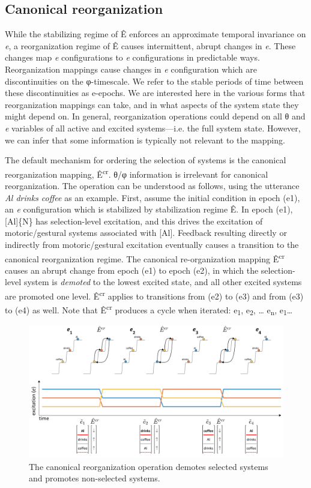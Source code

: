 \subsection{Canonical reorganization}

While the stabilizing regime of Ê enforces an approximate temporal invariance on \textit{e}, a reorganization regime of Ê causes intermittent, abrupt changes in \textit{e}. These changes map \textit{e} configurations to \textit{e} configurations in predictable ways. Reorganization mappings cause changes in \textit{e} configuration which are discontinuities on the φ-timescale. We refer to the stable periods of time between these discontinuities as e-epochs. We are interested here in the various forms that reorganization mappings can take, and in what aspects of the system state they might depend on. In general, reorganization operations could depend on all θ and \textit{e} variables of all active and excited systems—i.e. the full system state. However, we can infer that some information is typically not relevant to the mapping. 

  The default mechanism for ordering the selection of systems is the canonical reorganization mapping, Ê\textsuperscript{cr}. θ/φ information is irrelevant for canonical reorganization. The operation  can be understood as follows, using the utterance \textit{Al drinks coffee} as an example. First, assume the initial condition in epoch (e1), an \textit{e} configuration which is stabilized by stabilization regime Ê. In epoch (e1), [Al]\{N\} has selection-level excitation, and this drives the excitation of motoric/gestural systems associated with [Al]. Feedback resulting directly or indirectly from motoric/gestural excitation eventually causes a transition to the canonical reorganization regime. The canonical re-organization mapping Ê\textsuperscript{cr} causes an abrupt change from epoch (e1) to epoch (e2), in which the selection-level system is \textit{demoted} to the lowest excited state, and all other excited systems are promoted one level. Ê\textsuperscript{cr} applies to transitions from (e2) to (e3) and from (e3) to (e4) as well. Note that Ê\textsuperscript{cr} produces a cycle when iterated: e\textsubscript{1}, e\textsubscript{2}, … e\textsubscript{n}, e\textsubscript{1}… 

  
\begin{figure}
\includegraphics[width=\textwidth]{figures/Tilsen-img25.png}
\caption{The canonical reorganization operation demotes selected systems and promotes non-selected systems.}
\label{fig:2:18}
\end{figure}
 

